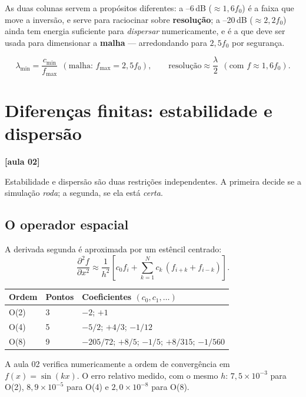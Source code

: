 \documentclass[11pt,a4paper,oneside]{report}
\newcommand{\aula}[1]{\textcolor{cianofwi}{\textbf{[aula #1]}}}
\begin{document}
As duas colunas servem a propósitos diferentes: a --6\,dB ($\approx 1{,}6 f_0$)
é a faixa que move a inversão, e serve para raciocinar sobre \textbf{resolução};
a --20\,dB ($\approx 2{,}2 f_0$) ainda tem energia suficiente para
\emph{dispersar} numericamente, e é a que deve ser usada para dimensionar a
\textbf{malha} --- arredondando para $2{,}5 f_0$ por segurança.

\begin{equation}
\lambda_{\min} = \frac{c_{\min}}{f_{\max}}\ \ (\text{malha: } f_{\max} = 2{,}5 f_0),
\qquad
\text{resolução} \approx \frac{\lambda}{2}\ \ (\text{com } f \approx 1{,}6 f_0).
\end{equation}

\chapter{Diferenças finitas: estabilidade e dispersão}
\label{cap:df}

\aula{02}

Estabilidade e dispersão são duas restrições independentes. A primeira decide
se a simulação \emph{roda}; a segunda, se ela está \emph{certa}.

\section{O operador espacial}

A derivada segunda é aproximada por um estêncil centrado:
\begin{equation}
\frac{\partial^{2} f}{\partial x^{2}} \approx
\frac{1}{h^{2}}\left[c_0 f_i + \sum_{k=1}^{N} c_k\,(f_{i+k} + f_{i-k})\right].
\end{equation}

\begin{center}
\begin{tabular}{@{}llp{7.6cm}@{}}
\toprule
\textbf{Ordem} & \textbf{Pontos} & \textbf{Coeficientes $(c_0, c_1, \dots)$} \\
\midrule
O(2) & 3 & $-2$; $+1$ \\
O(4) & 5 & $-5/2$; $+4/3$; $-1/12$ \\
O(8) & 9 & $-205/72$; $+8/5$; $-1/5$; $+8/315$; $-1/560$ \\
\bottomrule
\end{tabular}
\end{center}

A aula 02 verifica numericamente a ordem de convergência em $f(x)=\sin(kx)$.
O erro relativo medido, com o mesmo $h$: $7{,}5\times10^{-3}$ para O(2),
$8{,}9\times10^{-5}$ para O(4) e $2{,}0\times10^{-8}$ para O(8).
\end{document}
